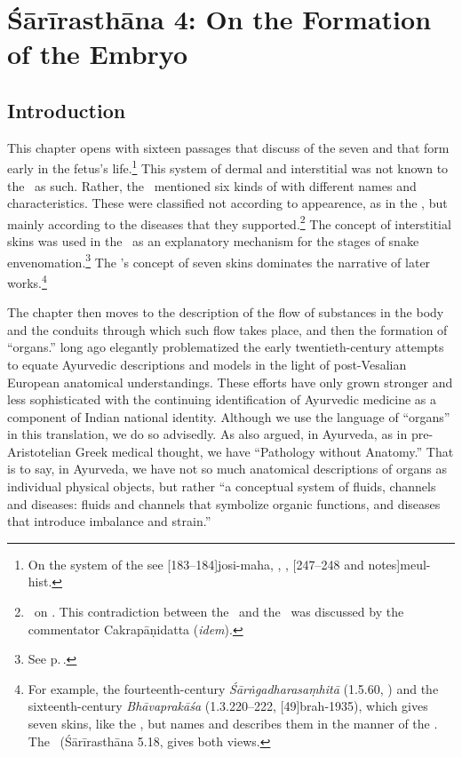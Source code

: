 
\chapter{Śārīrasthāna 4:  On the Formation of the Embryo}


\section{Introduction}

\label{skins-etc}
This chapter opens with sixteen passages that discuss of the seven
  and  that form early
in the fetus's life.\footnote{On the system of the  see
    [183--184]{josi-maha}, \cite[227--228]{gupt-1983},
    \cite[6]{kutu-1962}, [247--248 and notes]{meul-hist}.} This
    system of dermal and interstitial  was not
    known to the \CS\ as such.  Rather, the \CS\ mentioned six kinds of
     with different names and characteristics.
    These were classified not according to appearence, as in the \SS, but
    mainly according to the diseases that they
    supported.\footnote{\label{sa4:kalā}\CS\ on . This
        contradiction between the \CS\ and the \SS\ was discussed by the
        commentator Cakrapāṇidatta (\emph{idem}).} The concept of interstitial
        skins was used in the \SS\ as an explanatory mechanism for the stages
        of snake envenomation.\footnote{See p.\,\pageref{ka4:kalā-vega}.} The
            \SS's concept of seven skins dominates the narrative of later
            works.\footnote{For example, the fourteenth-century
                \emph{Śārṅgadharasaṃhitā} (1.5.60, \cite[40]{sast-1931}) and the
                sixteenth-century \emph{Bhāvaprakāśa} (1.3.220--222,
                [49]{brah-1935}), which gives seven skins, like the \SS,
                but names and describes them in the manner of the \CS. The \AS\
                (Śārīrasthāna 5.18, \cite[296--297]{atha-1980} gives both views.}

The chapter then moves to the description of the flow of substances in
the body and the conduits through which such flow takes place, and
then the formation of “organs.” \citet{zimm-1978,zimm-1978b} long ago
elegantly problematized the early twentieth-century attempts to equate
Ayurvedic descriptions and models in the light of post-Vesalian
European anatomical understandings. These efforts have only grown
stronger and less sophisticated with the continuing identification of
Ayurvedic medicine as a component of Indian national identity.
Although we use the language of “organs” in this translation, we do so
advisedly.  As \citet{zimm-1979} also argued, in Ayurveda, as in
pre-Aristotelian Greek medical thought, we have “Pathology without
Anatomy.”  That is to say, in Ayurveda, we have not so much 
anatomical descriptions of organs as individual physical objects, but
rather “a conceptual system of fluids, channels and diseases: fluids
and channels that symbolize organic functions, and diseases that
introduce imbalance and strain.”

